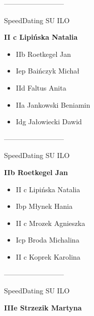 \documentclass[a4paper,10pt]{article}
\begin{document}
\begin{multicols}{3}
\begin{minipage}[l]{\textwidth}
\begin{itemize}
    \end{itemize}



\end{minipage}



\begin{minipage}[l]{\textwidth}
--------------------------

  \footnotesize{SpeedDating SU ILO}

  \bfseries{II c Lipińska Natalia}

  \begin{itemize}
    \item IIb Roetkegel Jan
    \item Iep Baińczyk Michał
    \item IId Faltus Anita
    \item IIa Jankowski Beniamin
    \item Idg Jałowiecki Dawid

    \end{itemize}



\end{minipage}



\begin{minipage}[l]{\textwidth}
--------------------------

  \footnotesize{SpeedDating SU ILO}

  \bfseries{IIb Roetkegel Jan}

  \begin{itemize}
    \item II c Lipińska Natalia
    \item Ibp Młynek Hania
    \item II c Mrozek Agnieszka
    \item Icp Broda Michalina
    \item II c Koprek Karolina

    \end{itemize}



\end{minipage}



\begin{minipage}[l]{\textwidth}
--------------------------

  \footnotesize{SpeedDating SU ILO}

  \bfseries{IIIe Strzezik Martyna}


\end{minipage}
\end{multicols}
\end{document}
